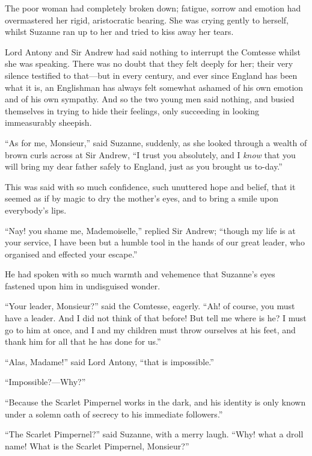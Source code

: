 \documentclass[paper=a5,BCOR=7mm,twoside,DIV=calc,12pt,usegeometry,chapterprefix,endperiod,headings=big]{scrbook}
\begin{document}
The poor woman had completely broken down; fatigue, sorrow and emotion had overmastered her rigid, aristocratic bearing. She was crying gently to herself, whilst Suzanne ran up to her and tried to kiss away her tears.

Lord Antony and Sir Andrew had said nothing to interrupt the Comtesse whilst she was speaking. There was no doubt that they felt deeply for her; their very silence testified to that---but in every century, and ever since England has been what it is, an Englishman has always felt somewhat ashamed of his own emotion and of his own sympathy. And so the two young men said nothing, and busied themselves in trying to hide their feelings, only succeeding in looking immeasurably sheepish.

\enquote{As for me, Monsieur,} said Suzanne, suddenly, as she looked through a wealth of brown curls across at Sir Andrew, \enquote{I trust you absolutely, and I \textit{know} that you will bring my dear father safely to England, just as you brought us to-day.}

This was said with so much confidence, such unuttered hope and belief, that it seemed as if by magic to dry the mother's eyes, and to bring a smile upon everybody's lips.

\enquote{Nay! you shame me, Mademoiselle,} replied Sir Andrew; \enquote{though my life is at your service, I have been but a humble tool in the hands of our great leader, who organised and effected your escape.}

He had spoken with so much warmth and vehemence that Suzanne's eyes fastened upon him in undisguised wonder.

\enquote{Your leader, Monsieur?} said the Comtesse, eagerly. \enquote{Ah! of course, you must have a leader. And I did not think of that before! But tell me where is he? I must go to him at once, and I and my children must throw ourselves at his feet, and thank him for all that he has done for us.}

\enquote{Alas, Madame!} said Lord Antony, \enquote{that is impossible.}

\enquote{Impossible?---Why?}

\enquote{Because the Scarlet Pimpernel works in the dark, and his identity is only known under a solemn oath of secrecy to his immediate followers.}

\enquote{The Scarlet Pimpernel?} said Suzanne, with a merry laugh. \enquote{Why! what a droll name! What is the Scarlet Pimpernel, Monsieur?}
\end{document}
